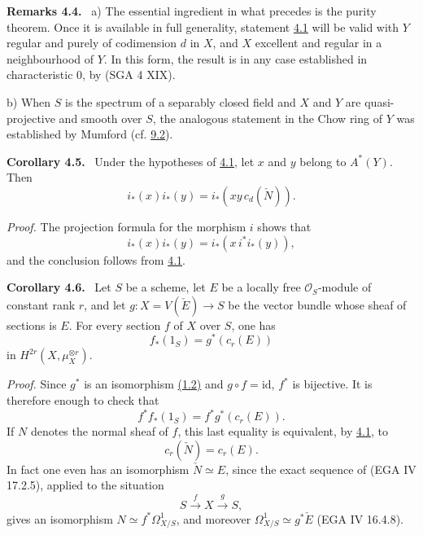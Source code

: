 \documentclass[11pt]{article}
\newenvironment{statement}[1]{\par\medskip\noindent\textbf{#1.}\ }{\par\medskip}
\begin{document}
\label{sga5:VII:remark:4.4}\begin{statement}{Remarks 4.4}
a) The essential ingredient in what precedes is the purity theorem. Once it is available in full generality, statement \hyperref[sga5:VII:theorem:4.1]{4.1} will be valid with $Y$ regular and purely of codimension $d$ in $X$, and $X$ excellent and regular in a neighbourhood of $Y$. In this form, the result is in any case established in characteristic $0$, by (SGA 4 XIX).

b) When $S$ is the spectrum of a separably closed field and $X$ and $Y$ are quasi-projective and smooth over $S$, the analogous statement in the Chow ring of $Y$ was established by Mumford (cf. \hyperref[sga5:VII:theorem:9.2]{9.2}).
\end{statement}

\label{sga5:VII:corollary:4.5}\begin{statement}{Corollary 4.5}
Under the hypotheses of \hyperref[sga5:VII:theorem:4.1]{4.1}, let $x$ and $y$ belong to $A^*(Y)$. Then
\[
i_*(x)i_*(y)=i_*(xy\,c_d(\check N)).
\]
\end{statement}

\emph{Proof.} The projection formula for the morphism $i$ shows that
\[
i_*(x)i_*(y)=i_*(x\,i^*i_*(y)),
\]
and the conclusion follows from \hyperref[sga5:VII:theorem:4.1]{4.1}.

\label{sga5:VII:corollary:4.6}\begin{statement}{Corollary 4.6}
Let $S$ be a scheme, let $E$ be a locally free $\mathcal O_S$-module of constant rank $r$, and let $g:X=V(\check E)\to S$ be the vector bundle whose sheaf of sections is $E$. For every section $f$ of $X$ over $S$, one has
\[
f_*(1_S)=g^*(c_r(E))
\]
in $H^{2r}(X,\mu_X^{\otimes r})$.
\end{statement}

\emph{Proof.} Since $g^*$ is an isomorphism \hyperref[sga5:VII:corollary:1.2]{(1.2)} and $g\circ f=\mathrm{id}$, $f^*$ is bijective. It is therefore enough to check that
\[
f^*f_*(1_S)=f^*g^*(c_r(E)).
\]
If $N$ denotes the normal sheaf of $f$, this last equality is equivalent, by \hyperref[sga5:VII:theorem:4.1]{4.1}, to
\[
c_r(\check N)=c_r(E).
\]
In fact one even has an isomorphism $\check N\simeq E$, since the exact sequence of (EGA IV 17.2.5), applied to the situation
\[
S\xrightarrow{f} X\xrightarrow{g} S,
\]
gives an isomorphism $N\simeq f^*\Omega^1_{X/S}$, and moreover $\Omega^1_{X/S}\simeq g^*\check E$ (EGA IV 16.4.8).
\end{document}
